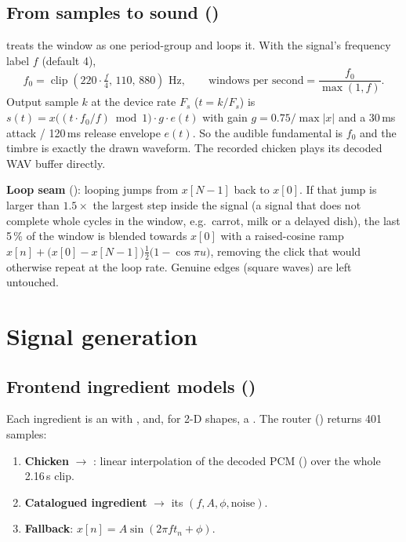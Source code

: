 \documentclass[11pt,a4paper]{article}
\begin{document}
\subsection{From samples to sound ()}
 treats the window as one period-group and loops it. With the
signal's frequency label $f$ (default 4),
\[
f_0=\operatorname{clip}\!\left(220\cdot\tfrac{f}{4},\,110,\,880\right)\text{ Hz},\qquad
\text{windows per second}=\frac{f_0}{\max(1,f)} .
\]
Output sample $k$ at the device rate $F_s$ ($t=k/F_s$) is
$s(t)=x\bigl((t\cdot f_0/f)\bmod 1\bigr)\cdot g\cdot e(t)$ with gain
$g=0.75/\max|x|$ and a 30\,ms attack / 120\,ms release envelope $e(t)$. So the audible
fundamental is $f_0$ and the timbre is exactly the drawn waveform. The recorded chicken
plays its decoded WAV buffer directly.

\textbf{Loop seam} (): looping jumps from $x[N-1]$ back to $x[0]$. If that
jump is larger than $1.5\times$ the largest step inside the signal (a signal that does not
complete whole cycles in the window, e.g.\ carrot, milk or a delayed dish), the last 5\,\% of
the window is blended towards $x[0]$ with a raised-cosine ramp
$x[n]+\bigl(x[0]-x[N-1]\bigr)\tfrac12\bigl(1-\cos\pi u\bigr)$, removing the click that would
otherwise repeat at the loop rate. Genuine edges (square waves) are left untouched.

\section{Signal generation}
\subsection{Frontend ingredient models ()}
Each ingredient is an  with ,
 and, for 2-D shapes, a . The router
 () returns 401 samples:
\begin{enumerate}
\item \textbf{Chicken} $\rightarrow$ : linear interpolation of the decoded PCM
  () over the whole 2.16\,s clip.
\item \textbf{Catalogued ingredient} $\rightarrow$ its $(f,A,\phi,\text{noise})$.
\item \textbf{Fallback}: $x[n]=A\sin(2\pi f t_n+\phi)$.
\end{enumerate}
\end{document}
